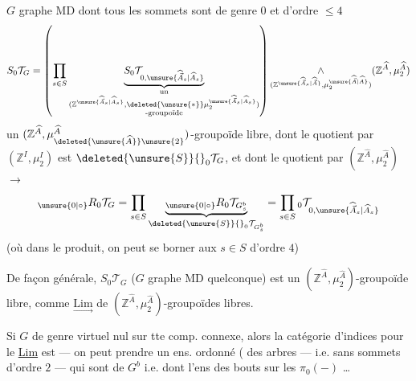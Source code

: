 $G$ graphe MD dont tous les sommets sont de genre $0$ et d'ordre $\leq 4$ 
\[
S_0\mathcal{T}_G=
\left(\prod_{s\in S}
\underset{\substack{\text{un}\\
(\mathbb{Z}^{\unsure{\widehat{\vec A}_s|\widehat A_s}},\deleted{\unsure{\ast}}\mu_2^{\unsure{\widehat{\vec A}_s|\widehat A_s}})\\
\text{-groupoïde}}}{\underbrace{S_0\mathcal{T}_{0,\unsure{\widehat{\vec A}_s|\widehat A_s}}}}
\right)
\mathop{\wedge}_{(\mathbb{Z}^{\unsure{\widehat{\vec A}_s|\widehat{\vec A}}},\mu_2^{\unsure{\widehat{\vec A}|\widehat A}})}
(\mathbb{Z}^{\widehat A},\mu_2^{\widehat A})
\]
un $(\mathbb{Z}^{\widehat A},\mu_{\deleted{\unsure{\widehat A}}\unsure{2}}^{\widehat A})$-groupoïde libre, dont le quotient par $(\mathbb{Z}^{I},\mu_2^I)$ est $\deleted{\unsure{S}}{}_0\mathcal{T}_G$, et dont le quotient par $(\mathbb{Z}^{\widehat A},\mu_2^{\widehat A})$ $\longrightarrow$
\[
{}_{\unsure{0|\circ}}R_0\mathcal{T}_G
=\prod_{s\in S}\underset{\deleted{\unsure{S}}{}_0\mathcal{T}_{G_s^b}}{\underbrace{{}_{\unsure{0|\circ}}R_0\mathcal{T}_{G_s^b}}}
=\prod_{s\in S}{}_0\mathcal{T}_{0,\unsure{\widehat{\vec A}_s|\widehat A_s}}
\]
(où dans le produit, on peut se borner aux $s\in S$ d'ordre $4$)

De façon générale, $S_0\mathcal{T}_G$ ($G$ graphe MD quelconque) est un $(\mathbb{Z}^{\widehat A},\mu_2^{\widehat A})$-groupoïde libre, comme $\underset{\longrightarrow}{\mathrm{Lim}}$  de $(\mathbb{Z}^{\widehat A},\mu_2^{\widehat A})$-groupoïdes libres.

Si $G$ de genre virtuel nul sur tte comp. connexe, alors la catégorie d'indices pour le \uline{Lim} est 
--- on peut  prendre un ens. ordonné ( des arbres   --- i.e. sans sommets d'ordre $2$ --- qui sont de  $G^b$ i.e.  dont l'ens  des bouts sur les $\pi_0(-)$ \ldots

